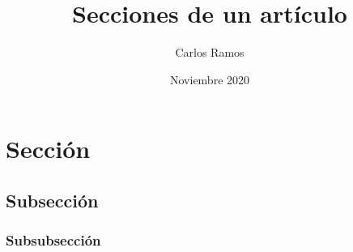 \documentclass{article}
\title{Secciones de un artículo}
\author{Carlos Ramos}
\date{Noviembre 2020}
\begin{document}
\maketitle

\section{Sección}

\subsection{Subsección}

\subsubsection{Subsubsección}
\end{document}
